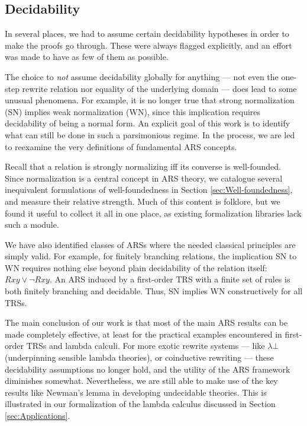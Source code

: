 \subsection{Decidability}
In several places, we had to assume certain decidability hypotheses in order to make
the proofs go through.  These were always flagged explicitly, and an effort was made to
have as few of them as possible.

The choice to \emph{not} assume decidability globally for anything --- not even the one-step rewrite relation nor equality of the underlying domain --- does lead to some unusual phenomena. For example, it is no longer true that strong normalization (SN) implies weak normalization (WN), since this implication requires decidability of being a normal form. An explicit goal of this work is to identify what can still be done in such a parsimonious regime. In the process, we are led to reexamine the very definitions of fundamental ARS concepts. 

Recall that a relation is strongly normalizing iff its converse is well-founded.~\cite[Def.1.1.13]{Terese}
Since normalization is a central concept in ARS theory, we catalogue several inequivalent formulations of well-foundedness in Section \ref{sec:Well-foundedness}, and measure their relative strength. Much of this content is folklore, but we found it useful to collect it all in one place, as existing formalization libraries lack such a module.

We have also identified classes of ARSs where the needed classical principles are simply valid.  For example, for finitely branching relations, the implication SN to WN requires nothing else beyond plain decidability of the relation itself: $Rxy \lor \lnot Rxy$. 
An ARS induced by a first-order TRS with a finite set of rules is both finitely branching and decidable. Thus, SN implies WN constructively for all TRSs.

The main conclusion of our work is that most of the main ARS results can be made completely effective, at least for the practical examples encountered in first-order TRSs and lambda calculi.
For more exotic rewrite systems --- like $\lambda \bot$ (underpinning sensible lambda theories), or coinductive rewriting ---
these decidability assumptions no longer hold,
and the utility of the ARS framework diminishes somewhat.
Nevertheless, we are still able to make use of the key results like Newman's lemma in developing undecidable theories.
This is illustrated in our formalization of the lambda calculus discussed in Section  \ref{sec:Applications}.

